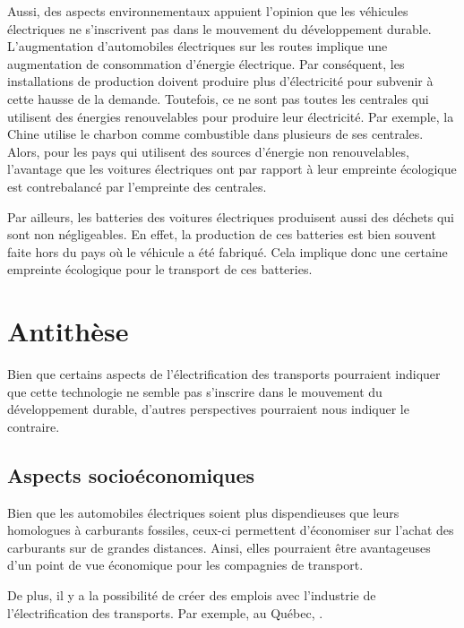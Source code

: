 Aussi, des aspects environnementaux appuient l'opinion que les véhicules électriques ne s'inscrivent pas dans le mouvement du développement durable. L'augmentation d'automobiles électriques sur les routes implique une augmentation de consommation d'énergie électrique. Par conséquent, les installations de production doivent produire plus d'électricité pour subvenir à cette hausse de la demande. Toutefois, ce ne sont pas toutes les centrales qui utilisent des énergies renouvelables pour produire leur électricité. Par exemple, la Chine utilise le charbon comme combustible dans plusieurs de ses centrales. Alors, pour les pays qui utilisent des sources d'énergie non renouvelables, l'avantage que les voitures électriques ont par rapport à leur empreinte écologique est contrebalancé par l'empreinte des centrales. 

Par ailleurs, les batteries des voitures électriques produisent aussi des déchets qui sont non négligeables. En effet, la production de ces batteries est bien souvent faite hors du pays où le véhicule a été fabriqué. Cela implique donc une certaine empreinte écologique pour le transport de ces batteries.

\section{Antithèse}

Bien que certains aspects de l'électrification des transports pourraient indiquer que cette technologie ne semble pas s'inscrire dans le mouvement du développement durable, d'autres perspectives pourraient nous indiquer le contraire. 

\subsection{Aspects socioéconomiques}

Bien que les automobiles électriques soient plus dispendieuses que leurs homologues à carburants fossiles, ceux-ci permettent d'économiser sur l'achat des carburants sur de grandes distances. Ainsi, elles pourraient être avantageuses d'un point de vue économique pour les compagnies de transport.

De plus, il y a la possibilité de créer des emplois avec l'industrie de l'électrification des transports. Par exemple, au Québec, .


